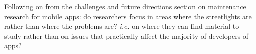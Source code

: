 \begin{mdframed}[style=MyFrame]
Following on from the challenges and future directions section on maintenance research for mobile apps: do researchers focus in areas where the streetlights are rather than where the problems are? \emph{i.e.} on where they can find material to study rather than on issues that practically affect the majority of developers of apps?


\end{mdframed}

